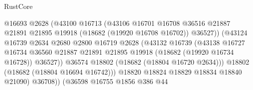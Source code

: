 \begin{lexlean}{RustCore}
\begin{coremodule}
                                          @16693
                                          @2628
                                          (@43100
                                            @16713
                                            (@43106
                                              @16701
                                              @16708
                                              @36516
                                              @21887
                                              @21891
                                              @21895
                                              @19918
                                              (@18682 (@19920 @16708 @16702))
                                              @36527))
                                          (@43124
                                            @16739
                                            @2634
                                            @2680
                                            @2800
                                            @16719
                                            @2628
                                            (@43132
                                              @16739
                                              (@43138
                                                @16727
                                                @16734
                                                @36560
                                                @21887
                                                @21891
                                                @21895
                                                @19918
                                                (@18682 (@19920 @16734 @16728))
                                                @36527))
                                            @36574
                                            @18802
                                            (@18682 (@18804 @16720 @2634)))
                                          @18802
                                          (@18682 (@18804 @16694 @16742)))
                                        @18820
                                        @18824
                                        @18829
                                        @18834
                                        @18840
                                        @21090)
                                      @36708))
                                  (@36598
                                    @16755
                                    @1856
                                    @386
                                    @44

\end{coremodule}
\end{lexlean}

